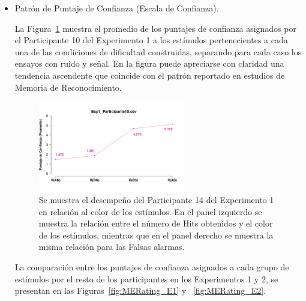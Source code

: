 \begin{itemize}
La comparación entre los Hits y Falsas Alarmas de cada condición de dificultad para el resto de los participantes de los Experimentos 1 y 2, se muestran en las Figuras~\ref{fig:MRate_E1} y ~\ref{fig:MRate_E2}.\\

\item Patrón de Puntaje de Confianza (Escala de Confianza).

La Figura~\ref{fig:MirrorRating_E1_P10} muestra el promedio de los puntajes de confianza asignados por el Participante 10 del Experimento 1 a los estímulos pertenecientes a cada una de las condiciones de dificultad construidas, separando para cada caso los ensayos con ruido y señal. En la figura puede apreciarse con claridad una tendencia ascendente que coincide con el patrón reportado en estudios de Memoria de Reconocimiento.\\

\begin{figure}[th]
\centering
\includegraphics[width=0.60\textwidth]{Figures/MirrorRating_Exp1_P10}
\caption[Comparación entre Puntajes de Confianza asignados por Condición; Ejemplo]{Se muestra el desempeño del Participante 14 del Experimento 1 en relación al color de los estímulos. En el panel izquierdo se muestra la relación entre el número de Hits obtenidos y el color de los estímulos, mientras que en el panel derecho se muestra la misma relación para las Falsas alarmas.}
\label{fig:MirrorRating_E1_P10}
\end{figure}

La comparación entre los puntajes de confianza asignados a cada grupo de estímulos por el resto de los participantes en los Experimentos 1 y 2, se presentan en las Figuras~\ref{fig:MERating_E1} y ~\ref{fig:MERating_E2}.\\

\end{itemize}




















